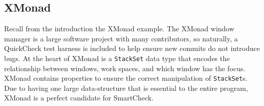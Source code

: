 \documentclass{sigplanconf}
\newenvironment{code}{\begin{alltt}\footnotesize}{\end{alltt}}
\newcommand{\ttp}[1]{\texttt{#1}}
\begin{document}


\subsection{XMonad}
Recall from the introduction the XMonad example.  The XMonad window manager is a
large software project with many contributors, so naturally, a QuickCheck
test harness is included to help ensure new commits do not introduce bugs.  At
the heart of XMonad is a \ttp{StackSet} data type that encodes the relationship
between windows, work spaces, and which window has the focus.  XMonad contains
properties to ensure the correct manipulation of \ttp{StackSet}s.  Due to having
one large data-structure that is essential to the entire program, XMonad is a
perfect candidate for SmartCheck.
\end{document}
